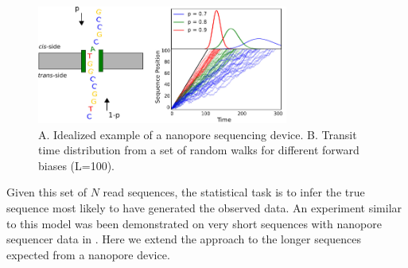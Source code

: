 \documentclass{biophys_letter}
\begin{document}
\begin{figure}%
  \centering
  \includegraphics[width=3.25in]{fig/fig1-withcartoon-jw-eps2pdf-cropped.pdf}
  \caption{A. Idealized example of a nanopore sequencing device. B. Transit time distribution from a set of random walks for different forward biases (L=100).}
  \label{fig:fig1}
\end{figure}

Given this set of $N$ read sequences, the statistical task is to infer the true sequence most likely to have generated the observed data.
An experiment similar to this model was been demonstrated on very short sequences with nanopore sequencer data in \cite{Ohshiro:2012}.
Here we extend the approach to the longer sequences expected from a nanopore device.

\end{document}
